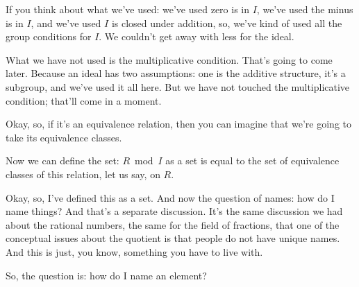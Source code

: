 \begin{speech}[00:33:28 - 00:34:47]
If you think about what we've used: we've used zero is in $I$, we've used the minus is in $I$, and we've used $I$ is closed under addition, so, we've kind of used all the group conditions for $I$. We couldn't get away with less for the ideal. 

What we have not used is the multiplicative condition. That's going to come later. Because an ideal has two assumptions: one is the additive structure, it's a subgroup, and we've used it all here. But we have not touched the multiplicative condition; that'll come in a moment. 

Okay, so, if it's an equivalence relation, then you can imagine that we're going to take its equivalence classes.
\end{speech}

\begin{speech}[00:34:47 - 00:36:03]
Now we can define the set: $R \bmod I$ as a set is equal to the set of equivalence classes  of this relation, let us say, on $R$.  

Okay, so, I've defined this as a set. And now the question of names: how do I name things? And that's a separate discussion. It's the same discussion we had about the rational numbers, the same for the field of fractions, that one of the conceptual issues about the quotient is that people do not have unique names. And this is just, you know, something you have to live with. 

So, the question is: how do I name an element? 
\end{speech}

\begin{content}
\end{content}

